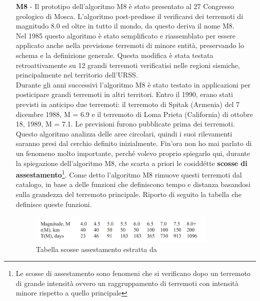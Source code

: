 \begin{itemize}
    \item[\textbf{M8} -] Il prototipo dell'algoritmo M8 \`e stato presentato al 27 Congresso geologico di Mosca.
L'algoritmo post-predisse il verificarsi dei terremoti di magnitudo 8.0 ed oltre in tutto il mondo, da questo deriva il nome M8.\\
Nel 1985 questo algoritmo \`e stato semplificato e riassemblato per essere applicato anche nella previsione terremoti di minore entit\`a, preservando lo schema e la definizione generale. Questa modifica \`e stata testata retroattivamente su 12 grandi terremoti verificatisi nelle regioni sismiche, principalmente nel territorio dell'URSS.\\
Durante gli anni successivi l'algoritmo M8 \`e stato testato in applicazioni per posticipare grandi terremoti in altri territori. Entro il 1990, erano stati previsti in anticipo due terremoti: il terremoto di Spitak (Armenia) del 7 dicembre 1988, M = 6.9 e il terremoto di Loma Prieta (California) di ottobre 18, 1989, M = 7.1. Le previsioni furono pubblicate prima dei terremoti. \cite{algortimoM8}\\
Questo algoritmo analizza delle aree circolari, quindi i suoi rilevamenti saranno presi dal cerchio definito inizialmente. Fin'ora non ho mai parlato di un fenomeno molto importante, perch\'e volevo proprio spiegarlo qui, durante la spiegazione dell'algoritmo M8, che scarta a priori le cosidd\'ette \textbf{scosse di assestamento}\footnote{Le scosse di assestamento sono fenomeni che si verificano dopo un terremoto di grande intensit\`a ovvero un raggruppamento di terremoti con intensit\`a minore rispetto a quello principale}. Come detto l'algoritmo M8 rimuove questi terremoti dal catalogo, in base a delle funzioni che definiscono tempo e distanza basandosi sulla grandezza del terremoto principale. Riporto di seguito la tabella che definisce queste funzioni.

\begin{figure}[H]
   \centering
   \includegraphics[width=0.850\textwidth]{images/TabellaScosseAssestamento.png}
   \caption{Tabella scosse assestamento estratta da \cite{M8Manual}}
   \label{img:tabellaScosseAssestamento}
\end{figure}


\end{itemize}
